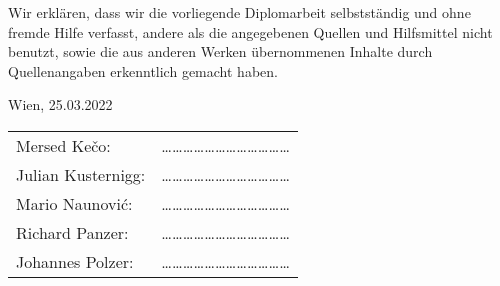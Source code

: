 Wir erklären, dass wir die vorliegende Diplomarbeit selbstständig und ohne fremde Hilfe verfasst, andere als die angegebenen Quellen und Hilfsmittel nicht benutzt, sowie die aus anderen Werken übernommenen Inhalte durch Quellenangaben erkenntlich gemacht haben.

\vspace{1cm}

Wien, 25.03.2022

\vspace{2cm}

\begin{tabular}{ll}
    \vspace{1.2cm}
    
    Mersed Kečo: & ……………………………… \\ \vspace{1.2cm}
    
    Julian Kusternigg: & ……………………………… \\ \vspace{1.2cm}
    
    Mario Naunović: & ……………………………… \\ \vspace{1.2cm}
    
    Richard Panzer: & ……………………………… \\ \vspace{1.2cm}
    
    Johannes Polzer: & ……………………………… \\

\end{tabular}
